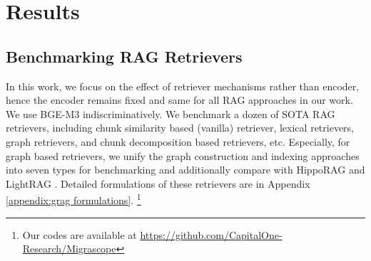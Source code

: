 \documentclass{article}
\theoremstyle{plain}
\theoremstyle{definition}
\theoremstyle{remark}
\begin{document}
\section{Results}

\label{sec:results}


\subsection{Benchmarking RAG Retrievers}

In this work, we focus on the effect of retriever mechanisms rather than encoder, hence the encoder remains fixed and same for all RAG approaches in our work. We use BGE-M3 \cite{chen2024bge} indiscriminatively. 
We benchmark a dozen of SOTA RAG retrievers, including chunk similarity based (vanilla) retriever, lexical retrievers, graph retrievers, and chunk decomposition based retrievers, etc. Especially, for graph based retrievers, we unify the graph construction and indexing approaches into seven types for benchmarking and additionally compare with HippoRAG \cite{gutierrez2025rag} and LightRAG \cite{guo2024lightrag}. Detailed formulations of these retrievers are in Appendix \ref{appendix:grag formulations}.
\footnote{Our codes are available at \url{https://github.com/CapitalOne-Research/Migrascope}}






\end{document}
